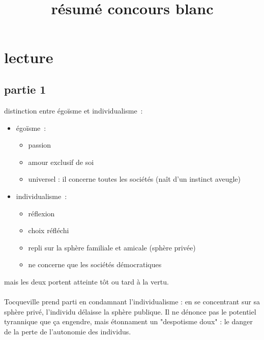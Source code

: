 

\setcounter{chapitre}{0}

\title{\Large \\ \Huge résumé concours blanc}



\maketitle

\section{lecture}

\subsection{partie 1}

distinction entre égoïsme et individualisme~:
\begin{itemize}
    \item égoïsme~:
    \begin{itemize}
        \item passion
        \item amour exclusif de soi
        \item universel : il concerne toutes les sociétés (naît d'un instinct aveugle)
    \end{itemize}
    \item individualisme~:
    \begin{itemize}
        \item réflexion
        \item choix réfléchi
        \item repli sur la sphère familiale et amicale (sphère privée)
        \item ne concerne que les sociétés démocratiques
    \end{itemize}
\end{itemize}
mais les deux portent atteinte tôt ou tard à la vertu.\\\\

Tocqueville prend parti en condamnant l'individualisme : en se concentrant sur sa sphère privé, l'individu délaisse la sphère publique. Il ne dénonce pas le potentiel tyrannique que ça engendre, mais étonnament un "despotisme doux" :  le danger de la perte de l'autonomie des individus.

